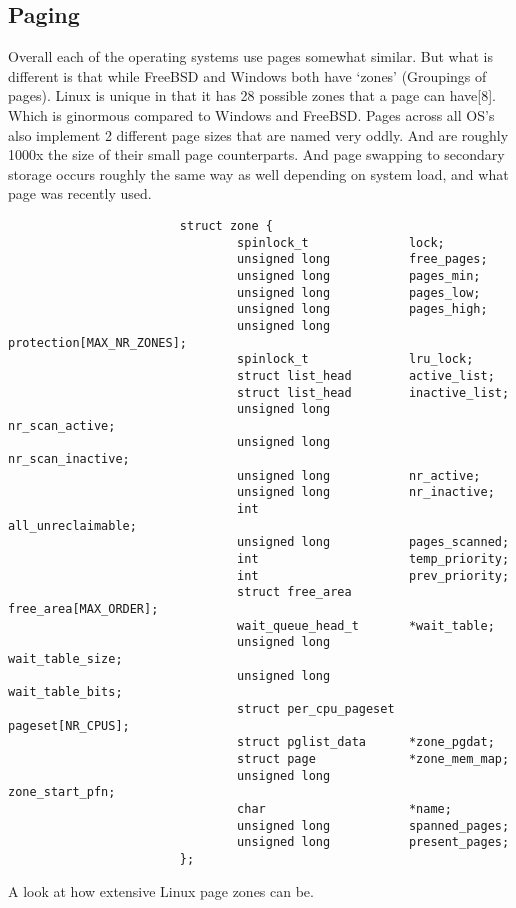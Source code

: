 \documentclass{article}
\begin{document}
\subsection{Paging}
	Overall each of the operating systems use pages somewhat similar. But what is different is that while FreeBSD and Windows both have ‘zones’ (Groupings of pages). Linux is unique in that it has 28 possible zones that a page can have[8]. Which is ginormous compared to Windows and FreeBSD. Pages across all OS’s also implement 2 different page sizes that are named very oddly. And are roughly 1000x the size of their small page counterparts. And page swapping to secondary storage occurs roughly the same way as well depending on system load, and what page was recently used.
            			\begin{lstlisting}
                        struct zone {
                                spinlock_t              lock;
                                unsigned long           free_pages;
                                unsigned long           pages_min;
                                unsigned long           pages_low;
                                unsigned long           pages_high;
                                unsigned long           protection[MAX_NR_ZONES];
                                spinlock_t              lru_lock;
                                struct list_head        active_list;
                                struct list_head        inactive_list;
                                unsigned long           nr_scan_active;
                                unsigned long           nr_scan_inactive;
                                unsigned long           nr_active;
                                unsigned long           nr_inactive;
                                int                     all_unreclaimable;
                                unsigned long           pages_scanned;
                                int                     temp_priority;
                                int                     prev_priority;
                                struct free_area        free_area[MAX_ORDER];
                                wait_queue_head_t       *wait_table;
                                unsigned long           wait_table_size;
                                unsigned long           wait_table_bits;
                                struct per_cpu_pageset  pageset[NR_CPUS];
                                struct pglist_data      *zone_pgdat;
                                struct page             *zone_mem_map;
                                unsigned long           zone_start_pfn;
                                char                    *name;
                                unsigned long           spanned_pages;
                                unsigned long           present_pages;
                        };

            		\end{lstlisting}
            	    	A look at how extensive Linux page zones can be.
\end{document}
